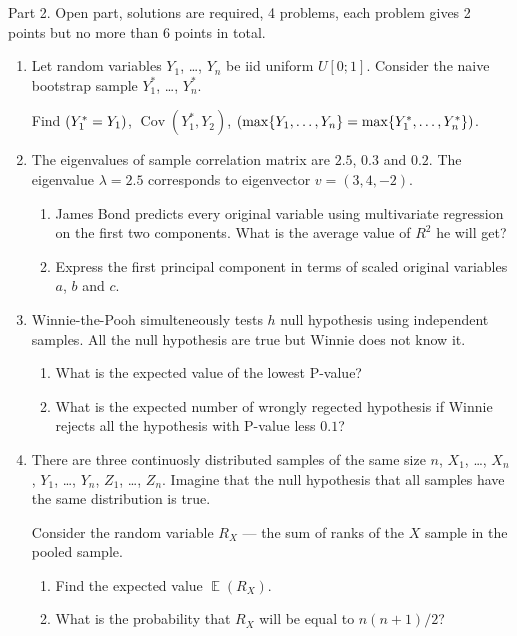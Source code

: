 \documentclass[11pt, a4paper]{article}
\DeclareMathOperator{\Cov}{Cov}
\DeclareMathOperator{\E}{\mathbb{E}}
\let\P\relax
\DeclareMathOperator{\P}{\mathbb{P}}
\theoremstyle{definition}
\begin{document}
Part 2. Open part, solutions are required, 4 problems, each problem gives 2 points but no more than 6 points in total.


\begin{enumerate}[resume]
    \item Let random variables $Y_1$, \ldots, $Y_n$ be iid uniform $U[0;1]$.
    Consider the naive bootstrap sample $Y_1^*$, \ldots, $Y_n^*$.
    
    Find $\P(Y_1^* = Y_1)$, $\Cov(Y_1^*, Y_2)$, $\P(\max\{Y_1, \ldots, Y_n\} = \max\{Y_1^*, \ldots, Y_n^*\})$.
    
    \item The eigenvalues of sample correlation matrix are $2.5$, $0.3$ and $0.2$. 
    The eigenvalue $\lambda=2.5$ corresponds to eigenvector $v=(3, 4, -2)$.

    \begin{enumerate}
        \item James Bond predicts every original variable using multivariate regression on the first two components.
        What is the average value of $R^2$ he will get? 
        \item Express the first principal component in terms of scaled original variables $a$, $b$ and $c$. 
    \end{enumerate}
    \item Winnie-the-Pooh simulteneously tests $h$ null hypothesis using independent samples. 
    All the null hypothesis are true but Winnie does not know it. 
    
    \begin{enumerate}
        \item What is the expected value of the lowest P-value?
        \item What is the expected number of wrongly regected hypothesis if Winnie rejects all the hypothesis with P-value less $0.1$?
    \end{enumerate}


\item There are three continuosly distributed samples of the same size $n$, $X_1$, \ldots, $X_n$, $Y_1$, \ldots, $Y_n$,
$Z_1$, \ldots, $Z_n$. Imagine that the null hypothesis that all samples have the same distribution is true. 

Consider the random variable $R_X$ — the sum of ranks of the $X$ sample in the pooled sample. 

\begin{enumerate}
    \item Find the expected value $\E(R_X)$.
    \item What is the probability that $R_X$ will be equal to $n(n+1)/2$?
\end{enumerate}


\end{enumerate}
\end{document}
